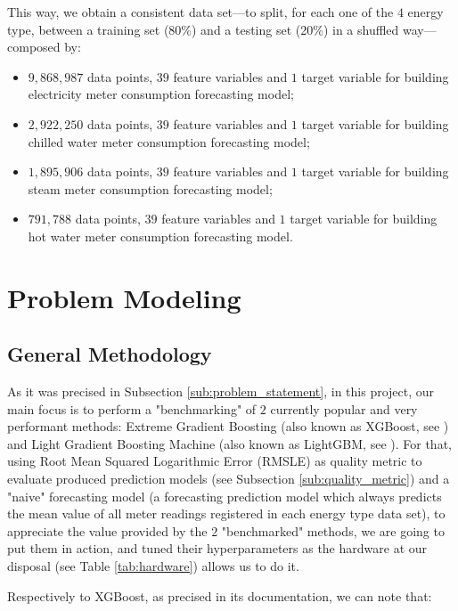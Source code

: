 \documentclass[twocolumn, switch]{article}
\begin{document}
This way, we obtain a consistent data set---to split, for each one of the $4$ energy type, between a training set (80\%) and a testing set (20\%) in a shuffled way---composed by:

\begin{itemize}
\item $9,868,987$ data points, $39$ feature variables and $1$ target variable for building electricity meter consumption forecasting model;
\item $2,922,250$ data points, $39$ feature variables and $1$ target variable for building chilled water meter consumption forecasting model;
\item $1,895,906$ data points, $39$ feature variables and $1$ target variable for building steam meter consumption forecasting model;
\item $791,788$ data points, $39$ feature variables and $1$ target variable for building hot water meter consumption forecasting model.
\end{itemize}


\section{Problem Modeling}

\subsection{General Methodology}

As it was precised in Subsection \ref{sub:problem_statement}, in this project, our main focus is to perform a "benchmarking" of $2$ currently popular and very performant methods: Extreme Gradient Boosting (also known as XGBoost, see \cite{Chen_2016}) and Light Gradient Boosting Machine (also known as LightGBM, see \cite{Ke_2017}). For that, using Root Mean Squared Logarithmic Error (RMSLE) as quality metric to evaluate produced prediction models (see Subsection \ref{sub:quality_metric}) and a "naive" forecasting model (a forecasting prediction model which always predicts the mean value of all meter readings registered in each energy type data set), to appreciate the value provided by the $2$ "benchmarked" methods, we are going to put them in action, and tuned their hyperparameters as the hardware at our disposal (see Table \ref{tab:hardware}) allows us to do it.

Respectively to XGBoost, as precised in its documentation, we can note that:
\end{document}
